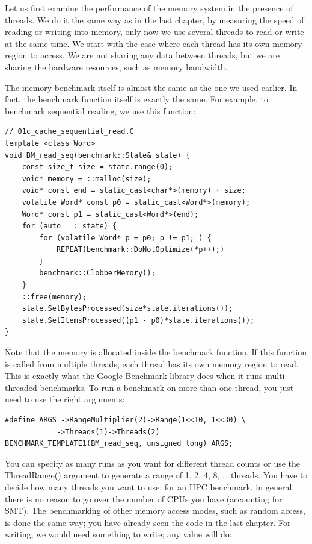 Let us first examine the performance of the memory system in the presence of threads. We do it the same way as in the last chapter, by measuring the speed of reading or writing into memory, only now we use several threads to read or write at the same time. We start with the case where each thread has its own memory region to access. We are not sharing any data between threads, but we are sharing the hardware resources, such as memory bandwidth.

The memory benchmark itself is almost the same as the one we used earlier. In fact, the benchmark function itself is exactly the same. For example, to benchmark sequential reading, we use this function:

\begin{lstlisting}[style=styleCXX]
// 01c_cache_sequential_read.C
template <class Word>
void BM_read_seq(benchmark::State& state) {
	const size_t size = state.range(0);
	void* memory = ::malloc(size);
	void* const end = static_cast<char*>(memory) + size;
	volatile Word* const p0 = static_cast<Word*>(memory);
	Word* const p1 = static_cast<Word*>(end);
	for (auto _ : state) {
		for (volatile Word* p = p0; p != p1; ) {
			REPEAT(benchmark::DoNotOptimize(*p++);)
		}
		benchmark::ClobberMemory();
	}
	::free(memory);
	state.SetBytesProcessed(size*state.iterations());
	state.SetItemsProcessed((p1 - p0)*state.iterations());
}
\end{lstlisting}

Note that the memory is allocated inside the benchmark function. If this function is called from multiple threads, each thread has its own memory region to read. This is exactly what the Google Benchmark library does when it runs multi-threaded benchmarks. To run a benchmark on more than one thread, you just need to use the right arguments:

\begin{lstlisting}[style=styleCXX]
#define ARGS ->RangeMultiplier(2)->Range(1<<10, 1<<30) \
			->Threads(1)->Threads(2)
BENCHMARK_TEMPLATE1(BM_read_seq, unsigned long) ARGS;
\end{lstlisting}


You can specify as many runs as you want for different thread counts or use the ThreadRange() argument to generate a range of 1, 2, 4, 8, … threads. You have to decide how many threads you want to use; for an HPC benchmark, in general, there is no reason to go over the number of CPUs you have (accounting for SMT). The benchmarking of other memory access modes, such as random access, is done the same way; you have already seen the code in the last chapter. For writing, we would need something to write; any value will do:

